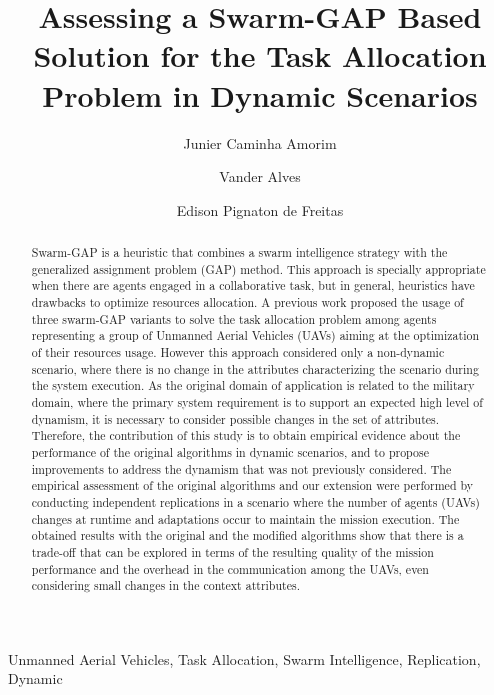 \documentclass[review]{elsarticle}
\newcommand{\uavs}{UAVs}
\begin{document}
\begin{frontmatter}
	
\title{Assessing a Swarm-GAP Based Solution for the Task Allocation Problem in Dynamic Scenarios}

\author[unbaddress]{Junier Caminha Amorim}

\author[unbaddress]{Vander Alves}

\author[ufrgsaddress]{Edison Pignaton de Freitas}

\address[unbaddress]{Computation Science Department University of Brasilia, Brazil}
\address[ufrgsaddress]{Institute of Informatics Federal University of Rio Grande do Sul, Brazil}

\begin{abstract}
Swarm-GAP is a heuristic that combines a swarm intelligence strategy with the generalized assignment problem (GAP) method. This approach is specially appropriate when there are agents engaged in a collaborative task, but in general, heuristics have drawbacks to optimize resources allocation. A previous work proposed the usage of three swarm-GAP variants to solve the task allocation problem among agents representing a group of Unmanned Aerial Vehicles (\uavs) aiming at the optimization of their resources usage. However this approach considered only a non-dynamic scenario, where there is no change in the attributes characterizing the scenario during the system execution. As the original domain of application is related to the military domain, where the primary system requirement is to support an expected high level of dynamism, it is necessary to consider possible changes in the set of attributes. Therefore, the contribution of this study is to obtain empirical evidence about the performance of the original algorithms in dynamic scenarios, and to propose improvements to address the dynamism that was not previously considered. The empirical assessment of the original algorithms and our extension were performed by conducting independent replications in a scenario where the number of agents (\uavs) changes at runtime and adaptations occur to maintain the mission execution. The obtained results with the original and the modified algorithms show that there is a trade-off that can be explored in terms of the resulting quality of the mission performance and the overhead in the communication among the \uavs, even considering small changes in the context attributes. 
\end{abstract}


\begin{keyword}
Unmanned Aerial Vehicles, Task Allocation, Swarm Intelligence, Replication, Dynamic
\end{keyword}

\end{frontmatter}
\end{document}
